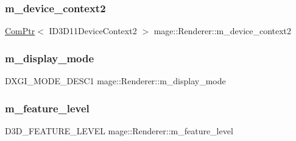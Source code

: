 \hypertarget{classmage_1_1_renderer_ab8d5eba948922f5ce1116b067e60bee7}{}\label{classmage_1_1_renderer_ab8d5eba948922f5ce1116b067e60bee7} 
\subsubsection{\texorpdfstring{m\+\_\+device\+\_\+context2}{m\_device\_context2}}
{\footnotesize\ttfamily \hyperlink{namespacemage_ae74f374780900893caa5555d1031fd79}{Com\+Ptr}$<$ I\+D3\+D11\+Device\+Context2 $>$ mage\+::\+Renderer\+::m\+\_\+device\+\_\+context2\hspace{0.3cm}{\ttfamily [private]}}

\hypertarget{classmage_1_1_renderer_af7ba5455da0dfa1f68ceeb49d43cf6f0}{}\label{classmage_1_1_renderer_af7ba5455da0dfa1f68ceeb49d43cf6f0} 
\subsubsection{\texorpdfstring{m\+\_\+display\+\_\+mode}{m\_display\_mode}}
{\footnotesize\ttfamily D\+X\+G\+I\+\_\+\+M\+O\+D\+E\+\_\+\+D\+E\+S\+C1 mage\+::\+Renderer\+::m\+\_\+display\+\_\+mode\hspace{0.3cm}{\ttfamily [private]}}

\hypertarget{classmage_1_1_renderer_aa97b108ef58f7d41ddb527f6ba2bfdf9}{}\label{classmage_1_1_renderer_aa97b108ef58f7d41ddb527f6ba2bfdf9} 
\subsubsection{\texorpdfstring{m\+\_\+feature\+\_\+level}{m\_feature\_level}}
{\footnotesize\ttfamily D3\+D\+\_\+\+F\+E\+A\+T\+U\+R\+E\+\_\+\+L\+E\+V\+EL mage\+::\+Renderer\+::m\+\_\+feature\+\_\+level\hspace{0.3cm}{\ttfamily [private]}}

\hypertarget{classmage_1_1_renderer_a72bb88b17491bd388460afae9d207b0a}{}\label{classmage_1_1_renderer_a72bb88b17491bd388460afae9d207b0a} 
